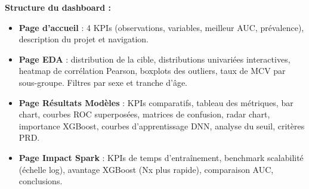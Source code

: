 \textbf{Structure du dashboard :}
\begin{itemize}
    \item \textbf{Page d'accueil} : 4 KPIs (observations, variables, meilleur AUC, prévalence), description du projet et navigation.
    \item \textbf{Page EDA} : distribution de la cible, distributions univariées interactives, heatmap de corrélation Pearson, boxplots des outliers, taux de MCV par sous-groupe. Filtres par sexe et tranche d'âge.
    \item \textbf{Page Résultats Modèles} : KPIs comparatifs, tableau des métriques, bar chart, courbes ROC superposées, matrices de confusion, radar chart, importance XGBoost, courbes d'apprentissage DNN, analyse du seuil, critères PRD.
    \item \textbf{Page Impact Spark} : KPIs de temps d'entraînement, benchmark scalabilité (échelle log), avantage XGBoost (Nx plus rapide), comparaison AUC, conclusions.
\end{itemize}

